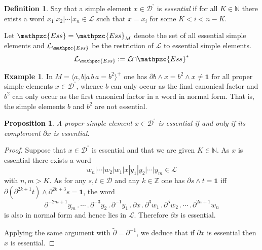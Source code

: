 \documentclass[a4paper,final]{article}
\theoremstyle{plain}
\newtheorem{proposition}[proposition]{Proposition}
\theoremstyle{remark}
\theoremstyle{definition}
\newtheorem{definition}[definition]{Definition}
\newtheorem{example}[example]{Example}
\begin{document}
\begin{definition}
  Say that a simple element $x \in {{\mathcal{D}}^{\!{}^{\circ}\!}}$ is \emph{essential} if
  for all $K \in {\mathbb{N}}$ there exists a word $x_1 |x_2 |\cdots |x_n \in
  {\mathcal{L}}$ such that $x = x_i$ for some $K < i < n-K$.
\end{definition}
Let ${\mathpzc{Ess}} = {\mathpzc{Ess}}_M$ denote the set of all essential simple elements and
${\mathcal{L}}_{\mathpzc{Ess}}$ be the restriction of ${\mathcal{L}}$ to essential simple
elements.
\[ {\mathcal{L}}_{\mathpzc{Ess}} := {\mathcal{L}} {\cap} {\mathpzc{Ess}}^* \]  

\begin{example}
  In $M = \langle a, b {\boldsymbol{\mid}} a\,b\,a = b^2\rangle^+$ one has ${\partial}
  b {\wedge} x = b^2 {\wedge} x \ne {\mathbf{1}}$ for all proper simple elements
  $x\in{{\mathcal{D}}^{\!{}^{\circ}\!}}$, whence $b$ can only occur as the final canonical
  factor and $b^2$ can only occur as the first canonical factor in a
  word in normal form.  That is, the simple elements $b$ and $b^2$ are
  not essential.
\end{example}

\begin{proposition} \label{prop:complement-essential}
  A proper simple element $x\in{{\mathcal{D}}^{\!{}^{\circ}\!}}$ is essential if and only if
  its complement ${\partial} x$ is essential.
\end{proposition}
\begin{proof}
  Suppose that $x\in{{\mathcal{D}}^{\!{}^{\circ}\!}}$ is essential and that we are given
  $K\in{\mathbb{N}}$.  As $x$ is essential there exists a word 
  \[ w_n |\cdots |w_2| w_1| x| y_1| y_2| \cdots |y_m \in {\mathcal{L}} \]
  with $n, m > K$.  As for any $s,t\in{\mathcal{D}}$ and any $k\in{\mathbb{Z}}$ one has ${\partial} s{\wedge} t={\mathbf{1}}$ iff ${\partial}({\partial}^{2k+1} t){\wedge} {\partial}^{2k+3} s={\mathbf{1}}$, the word
  \[ {\partial}^{-2m+1} y_m {\mathbin{.}} \cdots {\mathbin{.}} {\partial}^{-3} y_2 {\mathbin{.}}
     {\partial}^{-1} y_1 {\mathbin{.}} {\partial} x {\mathbin{.}} {\partial}^3 w_1 {\mathbin{.}}
     {\partial}^5 w_2 {\mathbin{.}} \cdots {\mathbin{.}} {\partial}^{2n+1} w_n \]
  is also in normal form and hence lies in ${\mathcal{L}}$.  Therefore
  ${\partial} x$ is essential.

  Applying the same argument with ${\widetilde{\partial}} = {\partial}^{-1}$, we deduce
  that if ${\partial} x$ is essential then $x$ is essential.
\end{proof}
\end{document}
